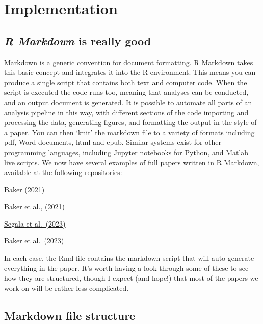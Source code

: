 \documentclass[
]{article}
\begin{document}
\hypertarget{implementation}{%
\section{Implementation}\label{implementation}}

\hypertarget{r-markdown-is-really-good}{%
\subsection{\texorpdfstring{\emph{R Markdown} is really good}{R Markdown is really good}}\label{r-markdown-is-really-good}}

\href{https://www.markdownguide.org/}{Markdown} is a generic convention for document formatting. R Markdown takes this basic concept and integrates it into the R environment. This means you can produce a single script that contains both text and computer code. When the script is executed the code runs too, meaning that analyses can be conducted, and an output document is generated. It is possible to automate all parts of an analysis pipeline in this way, with different sections of the code importing and processing the data, generating figures, and formatting the output in the style of a paper. You can then `knit' the markdown file to a variety of formats including pdf, Word documents, html and epub. Similar systems exist for other programming languages, including \href{https://jupyter.org/}{Jupyter notebooks} for Python, and \href{https://uk.mathworks.com/help/matlab/matlab_prog/what-is-a-live-script-or-function.html}{Matlab live scripts}. We now have several examples of full papers written in R Markdown, available at the following repositories:

\href{https://github.com/bakerdh/FourierStats}{Baker (2021)}

\href{https://osf.io/e62wu/}{Baker et al., (2021)}

\href{https://doi.org/10.17605/OSF.IO/TBEMA}{Segala et al.~(2023)}

\href{https://doi.org/10.17605/OSF.IO/AB3YV}{Baker et al.~(2023)}

In each case, the Rmd file contains the markdown script that will auto-generate everything in the paper. It's worth having a look through some of these to see how they are structured, though I expect (and hope!) that most of the papers we work on will be rather less complicated.

\hypertarget{markdown-file-structure}{%
\subsection{Markdown file structure}\label{markdown-file-structure}}
\end{document}
